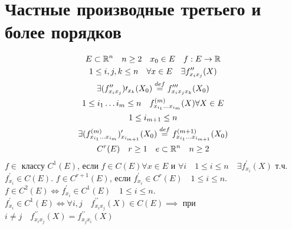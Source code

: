 \documentclass[main]{subfiles}
\begin{document}
\section{Частные производные третьего и более порядков}
\begin{gather*}
    E \subset \mathbb{R}^n \quad n \geq 2 \quad x_0 \in E \quad f: E \rightarrow \mathbb{R} \\
    1 \leq i,j,k \leq n \quad \forall x \in E \quad \exists f^{\prime\prime}_{x_ix_j}(X) \\
    \exists (f^{\prime\prime}_{x_ix_j})\prime_{x_k}(X_0) \stackrel{def}{=} f^{\prime\prime\prime}_{x_ix_jx_k}(X_0) \\
    1 \leq i_1 \ldots i_m \leq n \quad f^{(m)}_{x_{i_1}\ldots x_{i_m}}(X) \forall X \in E \\
    1 \leq i_{m+1} \leq n \\
    \exists (f^{(m)}_{x_{i_1} \ldots x_{i_m}})^{\prime}_{x_{i_{m+1}}}(X_0) \stackrel{def}{=} f^{(m+1)}_{x_{i_1} \ldots x_{i_{m+1}}}(X_0) \\
    C^r(E) \quad r \geq 1 \quad e \subset \mathbb{R}^n \quad n \geq 2 
\end{gather*}
    $f \in$ классу $C^1(E)$, если $f \in C(E) \forall x \in E$ и $\forall i \quad 1 \leq i \leq n \quad
    \exists f^{\prime}_{x_i}(X)$ т.ч. $f^\prime_{x_i} \in C(E)$. $f \in C^{r+1}(E)$, если $f^\prime_{x_i} \in C^r(E) \quad 1 \leq i \leq n$.
    $f \in C^2(E) \Leftrightarrow f^\prime_{x_i} \in C^1(E) \quad 1 \leq i \leq n$. $f^\prime_{x_i} \in C^1(E) \Leftrightarrow
    \forall i, j \quad  f^{\prime\prime}_{x_i x_j}(X) \in C(E) \implies$ при $i \ne j \quad f^{\prime\prime}_{x_ix_j}(X) = f^{\prime\prime}_{x_jx_i}(X)$
\end{document}
